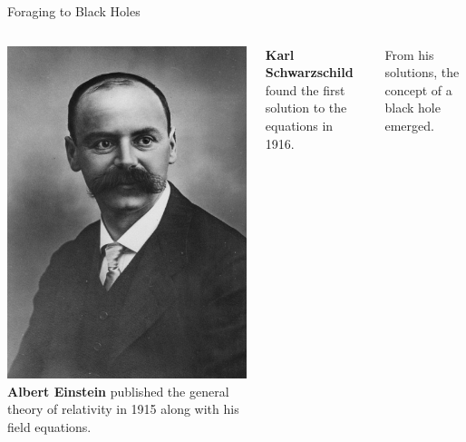 \documentclass{beamer}
\begin{document}
\begin{frame}{Foraging to Black Holes}
    \begin{columns}
        \centering
        \includegraphics[width=\textwidth]{asset/schwarzschild.jpg}
        \centering
        \textbf{Albert Einstein} published the general theory of relativity in 1915 along with his field equations.

        \vspace{0.5cm}

        \textbf{Karl Schwarzschild} found the first solution to the equations in 1916.

        \vspace{0.5cm}

        From his solutions, the concept of a black hole emerged.
    \end{columns}

\end{frame}
\end{document}
